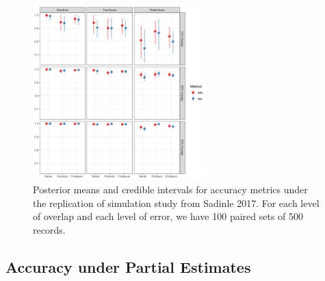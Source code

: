 \documentclass[12pt,letterpaper]{article}
\newcommand{\1}[1]{\mathbb{I}\!\left[#1\right]} %
\begin{document}
%	


\begin{figure}[h!]
\begin{center}
\includegraphics[width=0.6\textwidth]{../notes/figures/sadinle_sim_plot2} 
\caption{Posterior means and credible intervals for accuracy metrics under the replication of simulation study from Sadinle 2017. For each level of overlap and each level of error, we have 100 paired sets of 500 records.}
\label{fig:sadinle_simulation}
\end{center}
\end{figure}

%
%	
%		
%	
%	

\hypertarget{partial}{%
	\subsection{Accuracy under Partial Estimates}\label{partial}}
\end{document}
